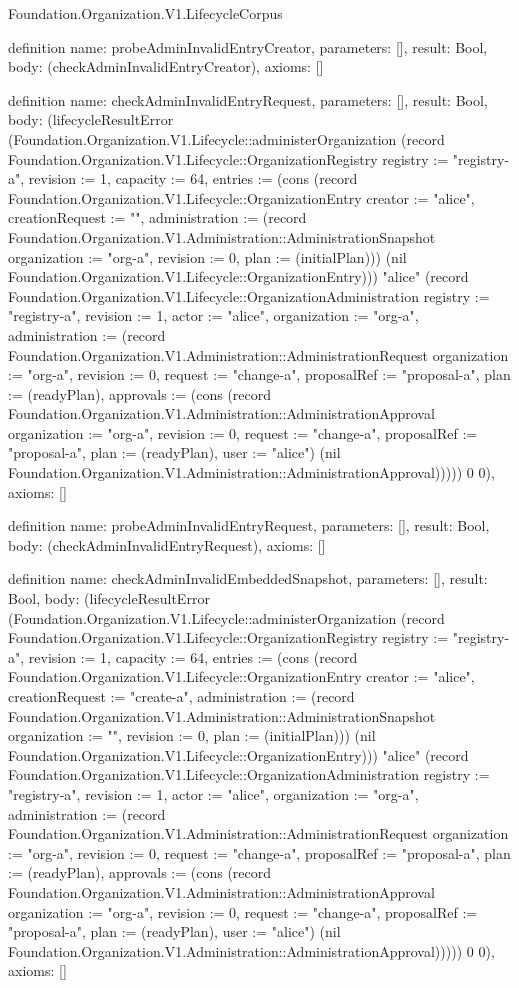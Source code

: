 \begin{lexlean}{Foundation.Organization.V1.LifecycleCorpus}
\begin{semanticmodule}
definition{
  name: probeAdminInvalidEntryCreator,
  parameters: [],
  result: Bool,
  body: (checkAdminInvalidEntryCreator),
  axioms: []
}

definition{
  name: checkAdminInvalidEntryRequest,
  parameters: [],
  result: Bool,
  body: (lifecycleResultError (Foundation.Organization.V1.Lifecycle::administerOrganization (record Foundation.Organization.V1.Lifecycle::OrganizationRegistry {registry := "registry-a", revision := 1, capacity := 64, entries := (cons (record Foundation.Organization.V1.Lifecycle::OrganizationEntry {creator := "alice", creationRequest := "", administration := (record Foundation.Organization.V1.Administration::AdministrationSnapshot {organization := "org-a", revision := 0, plan := (initialPlan)})}) (nil Foundation.Organization.V1.Lifecycle::OrganizationEntry))}) "alice" (record Foundation.Organization.V1.Lifecycle::OrganizationAdministration {registry := "registry-a", revision := 1, actor := "alice", organization := "org-a", administration := (record Foundation.Organization.V1.Administration::AdministrationRequest {organization := "org-a", revision := 0, request := "change-a", proposalRef := "proposal-a", plan := (readyPlan), approvals := (cons (record Foundation.Organization.V1.Administration::AdministrationApproval {organization := "org-a", revision := 0, request := "change-a", proposalRef := "proposal-a", plan := (readyPlan), user := "alice"}) (nil Foundation.Organization.V1.Administration::AdministrationApproval))})})) 0 0),
  axioms: []
}

definition{
  name: probeAdminInvalidEntryRequest,
  parameters: [],
  result: Bool,
  body: (checkAdminInvalidEntryRequest),
  axioms: []
}

definition{
  name: checkAdminInvalidEmbeddedSnapshot,
  parameters: [],
  result: Bool,
  body: (lifecycleResultError (Foundation.Organization.V1.Lifecycle::administerOrganization (record Foundation.Organization.V1.Lifecycle::OrganizationRegistry {registry := "registry-a", revision := 1, capacity := 64, entries := (cons (record Foundation.Organization.V1.Lifecycle::OrganizationEntry {creator := "alice", creationRequest := "create-a", administration := (record Foundation.Organization.V1.Administration::AdministrationSnapshot {organization := "", revision := 0, plan := (initialPlan)})}) (nil Foundation.Organization.V1.Lifecycle::OrganizationEntry))}) "alice" (record Foundation.Organization.V1.Lifecycle::OrganizationAdministration {registry := "registry-a", revision := 1, actor := "alice", organization := "org-a", administration := (record Foundation.Organization.V1.Administration::AdministrationRequest {organization := "org-a", revision := 0, request := "change-a", proposalRef := "proposal-a", plan := (readyPlan), approvals := (cons (record Foundation.Organization.V1.Administration::AdministrationApproval {organization := "org-a", revision := 0, request := "change-a", proposalRef := "proposal-a", plan := (readyPlan), user := "alice"}) (nil Foundation.Organization.V1.Administration::AdministrationApproval))})})) 0 0),
  axioms: []
}


\end{semanticmodule}
\end{lexlean}
